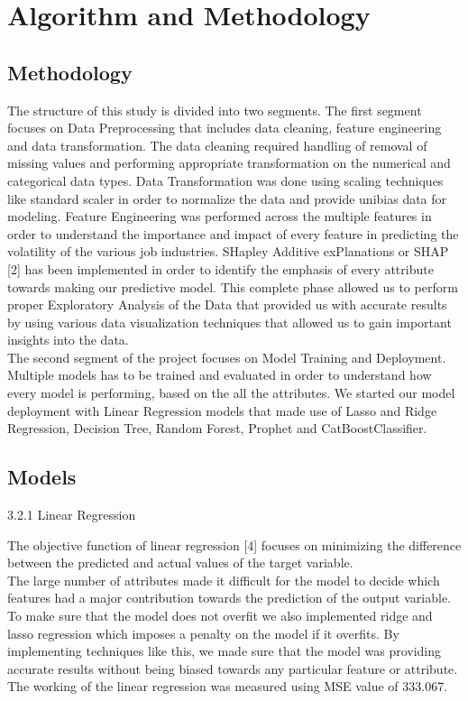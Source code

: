 \documentclass[fleqn,10pt]{SelfArx} %
\begin{document}
\bigskip
\bigskip


\section{Algorithm and Methodology}

\subsection{Methodology}

The structure of this study is divided into two segments. The first segment focuses on Data Preprocessing that includes data cleaning, feature engineering and data transformation. The data cleaning required handling of removal of missing values and performing appropriate transformation on the numerical and categorical data types. Data Transformation was done using scaling techniques like standard scaler in order to normalize the data and provide unibias data for modeling. Feature Engineering was performed across the multiple features in order to understand the importance and impact of every feature in predicting the volatility of the various job industries. SHapley Additive exPlanations or SHAP [2] has been implemented in order to identify the emphasis of every attribute towards making our predictive model. This complete phase allowed us to perform proper Exploratory Analysis of the Data that provided us with accurate results by using various data visualization techniques that allowed us to gain important insights into the data.\\

The second segment of the project focuses on Model Training and Deployment. Multiple models has to be trained and evaluated in order to understand how every model is performing, based on the all the attributes. We started our model deployment with Linear Regression models that made use of Lasso and Ridge Regression, Decision Tree, Random Forest, Prophet and CatBoostClassifier.

\subsection{Models}


3.2.1 Linear Regression

The objective function of linear regression [4] focuses on minimizing the difference between the predicted and actual values of the target variable.\\ The large number of attributes made it difficult for the model to decide which features had a major contribution towards the prediction of the output variable. To make sure that the model does not overfit we also implemented ridge and lasso regression which imposes a penalty on the model if it overfits. By implementing techniques like this, we made sure that the model was providing accurate results without being biased towards any particular feature or attribute. The working of the linear regression was measured using MSE value of 333.067.\\
\end{document}
